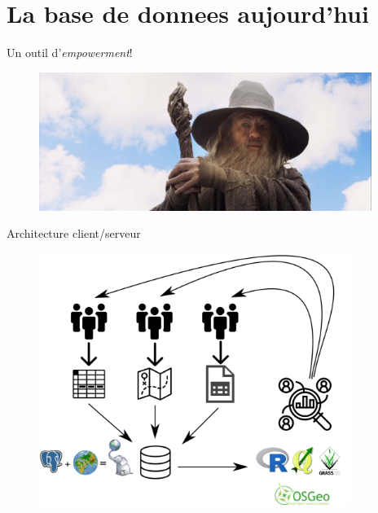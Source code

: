 \documentclass[newPxFont]{beamer}
\begin{document}
\section{La base de donnees aujourd'hui}

\begin{frame}[c]{Un outil d'\textit{empowerment}!}
\vspace{-2em}
\begin{figure}
	\centering
	\includegraphics[height = 4.5cm]{img/gandalf}
\end{figure}
\end{frame}

\begin{frame}[c]{Architecture client/serveur}
\vspace{-2em}
\begin{figure}
	\centering
	\includegraphics[width = 0.9\textwidth]{img/cooperation}
\end{figure}
\end{frame}
\end{document}
